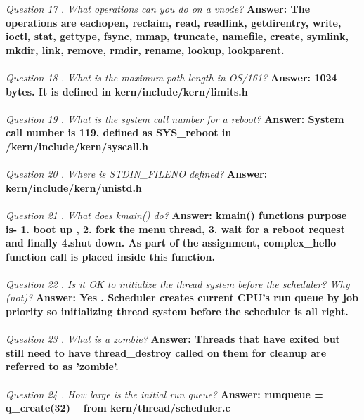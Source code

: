 \documentclass[11pt, english]{article}
\begin{document}
\textit{ Question 17 .  What operations can you do on a vnode?  }\newline
\textbf{Answer: The operations are eachopen, reclaim, read, readlink, getdirentry, write, ioctl, stat, gettype, fsync, mmap, truncate, namefile, create, symlink, mkdir, link, remove, rmdir, rename, lookup, lookparent.}\\ \\
\textit{ Question 18 .  What is the maximum path length in OS/161?  }\newline
\textbf{Answer: 1024 bytes. It is defined  in kern/include/kern/limits.h}\\ \\
\textit{ Question 19 .  What is the system call number for a reboot?  }\newline
\textbf{Answer: System call number is  119, defined as SYS\_reboot in /kern/include/kern/syscall.h}\\ \\
\textit{ Question 20 .  Where is STDIN\_FILENO defined?  }\newline
\textbf{Answer: kern/include/kern/unistd.h}\\ \\
\textit{ Question 21 .  What does kmain() do?  }\newline
\textbf{Answer: kmain() functions purpose is- 1. boot up , 2. fork the menu thread, 3. wait for a reboot request and finally 4.shut down. As part of the assignment, complex\_hello function call is placed inside this function.}\\ \\
\textit{ Question 22 .  Is it OK to initialize the thread system before the scheduler? Why (not)? }\newline
\textbf{Answer: Yes . Scheduler creates current CPU's run queue by job priority so initializing thread system before the scheduler is all right.}\\ \\
\textit{ Question 23 .  What is a zombie? }\newline
\textbf{Answer: Threads that have exited but still need to have thread\_destroy called on them for cleanup are referred to as 'zombie'.}\\ \\
\textit{ Question 24 . How large is the initial run queue? }\newline
\textbf{Answer:  runqueue = q\_create(32) -- from kern/thread/scheduler.c  }\\ \\
\end{document}
